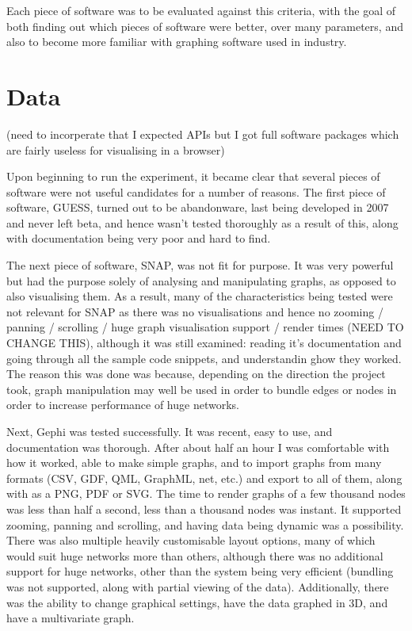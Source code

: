 \documentclass{l4proj}
\begin{document}
Each piece of software was to be evaluated against this criteria, with the goal of both finding out which pieces of software were better, over many parameters, and also to become more familiar with graphing software used in industry.

\section{Data}

(need to incorperate that I expected APIs but I got full software packages which are fairly useless for visualising in a browser)

Upon beginning to run the experiment, it became clear that several pieces of software were not useful candidates for a number of reasons. The first piece of software, GUESS, turned out to be abandonware, last being developed in 2007 and never left beta, and hence wasn't tested thoroughly as a result of this, along with documentation being very poor and hard to find. 

The next piece of software, SNAP, was not fit for purpose. It was very powerful but had the purpose solely of analysing and manipulating graphs, as opposed to also visualising them. As a result, many of the characteristics being tested were not relevant for SNAP as there was no visualisations and hence no zooming / panning / scrolling / huge graph visualisation support / render times (NEED TO CHANGE THIS), although it was still examined: reading it's documentation and going through all the sample code snippets, and understandin ghow they worked. The reason this was done was because, depending on the direction the project took, graph manipulation may well be used in order to bundle edges or nodes in order to increase performance of huge networks. 

Next, Gephi was tested successfully. It was recent, easy to use, and documentation was thorough. After about half an hour I was comfortable with how it worked, able to make simple graphs, and to import graphs from many formats (CSV, GDF, QML, GraphML, net, etc.) and export to all of them, along with as a PNG, PDF or SVG. The time to render graphs of a few thousand nodes was less than half a second, less than a thousand nodes was instant. It supported zooming, panning and scrolling, and having data being dynamic was a possibility. There was also multiple heavily customisable layout options, many of which would suit huge networks more than others, although there was no additional support for huge networks, other than the system being very efficient (bundling was not supported, along with partial viewing of the data). Additionally, there was the ability to change graphical settings, have the data graphed in 3D, and have a multivariate graph. 
\end{document}
